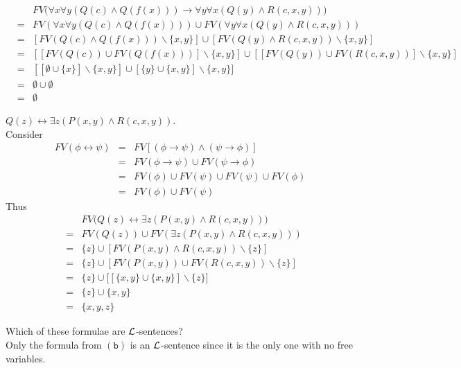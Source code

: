 \documentclass[11pt,a4paper]{article}
\begin{document}
\apartnb
\[\begin{array}{rcl}
&&FV\big(\forall x\forall y(Q(c)\wedge Q(f(x)))\to\forall y\forall x(Q(y)\wedge R(c,x,y))\big)\\
&=&FV(\forall x\forall y(Q(c)\wedge Q(f(x))))\cup FV(\forall y\forall x(Q(y)\wedge R(c,x,y)))\\
&=&[FV(Q(c)\wedge Q(f(x)))\backslash\{x,y\}]\cup[FV(Q(y)\wedge R(c,x,y))\backslash\{x,y\}]\\
&=&[[FV(Q(c))\cup FV(Q(f(x)))]\backslash\{x,y\}]\cup[[FV(Q(y))\cup FV(R(c,x,y))]\backslash\{x,y\}]\\
&=&[[\emptyset\cup\{x\}]\backslash\{x,y\}]\cup[\{y\}\cup\{x,y\}]\backslash\{x,y\}]\\
&=&\emptyset\cup\emptyset\\
&=&\emptyset
\end{array}\]

\qpartnb $Q(z)\longleftrightarrow\exists z(P(x,y)\wedge R(c,x,y))$.\\

\apart
Consider
\[\begin{array}{rcl}
FV(\phi\longleftrightarrow\psi)&=&FV[(\phi\to\psi)\wedge(\psi\to\phi)]\\
&=&FV(\phi\to\psi)\cup FV(\psi\to\phi)\\
&=&FV(\phi)\cup FV(\psi)\cup FV(\psi)\cup FV(\phi)\\
&=&FV(\phi)\cup FV(\psi)
\end{array}\]
Thus
\[\begin{array}{rcl}
&&FV\big(Q(z)\longleftrightarrow\exists z(P(x,y)\wedge R(c,x,y))\big)\\
&=&FV(Q(z))\cup FV(\exists z(P(x,y)\wedge R(c,x,y)))\\
&=&\{z\}\cup[FV(P(x,y)\wedge R(c,x,y))\backslash\{z\}]\\
&=&\{z\}\cup[FV(P(x,y))\cup FV(R(c,x,y))\backslash\{z\}]\\
&=&\{z\}\cup\big[[\{x,y\}\cup\{x,y\}]\backslash\{z\}\big]\\
&=&\{z\}\cup\{x,y\}\\
&=&\{x,y,z\}
\end{array}\]

\qpartnb Which of these formulae are $\mathcal{L}$-sentences?\\

\apartnb Only the formula from $\mathtt{(b)}$ is an $\mathcal{L}$-sentence since it is the only one with no free variables.
\end{document}
